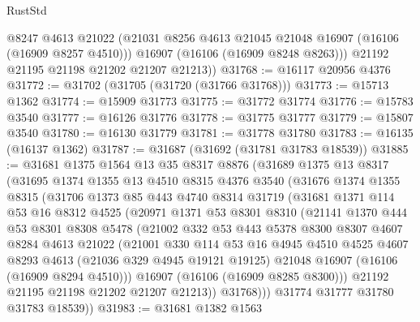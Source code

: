 \begin{lexlean}{RustStd}
\begin{coremodule}
          @8247
          @4613
          @21022
          (@21031 @8256 @4613 @21045 @21048 @16907 (@16106 (@16909 @8257 @4510)))
          @16907
          (@16106 (@16909 @8248 @8263)))
        @21192
        @21195
        @21198
        @21202
        @21207
        @21213))
@31768 := @16117 @20956 @4376
@31772 := @31702 (@31705 (@31720 (@31766 @31768)))
@31773 := @15713 @1362
@31774 := @15909 @31773
@31775 := @31772 @31774
@31776 := @15783 @3540
@31777 := @16126 @31776
@31778 := @31775 @31777
@31779 := @15807 @3540
@31780 := @16130 @31779
@31781 := @31778 @31780
@31783 := @16135 (@16137 @1362)
@31787 := @31687 (@31692 (@31781 @31783 @18539))
@31885 := @31681
    @1375
    @1564
    @13
    @35
    @8317
    @8876
    (@31689
      @1375
      @13
      @8317
      (@31695
        @1374
        @1355
        @13
        @4510
        @8315
        @4376
        @3540
        (@31676
          @1374
          @1355
          @8315
          (@31706
            @1373
            @85
            @443
            @4740
            @8314
            @31719
            (@31681
              @1371
              @114
              @53
              @16
              @8312
              @4525
              (@20971
                @1371
                @53
                @8301
                @8310
                (@21141
                  @1370
                  @444
                  @53
                  @8301
                  @8308
                  @5478
                  (@21002
                    @332
                    @53
                    @443
                    @5378
                    @8300
                    @8307
                    @4607
                    @8284
                    @4613
                    @21022
                    (@21001
                      @330
                      @114
                      @53
                      @16
                      @4945
                      @4510
                      @4525
                      @4607
                      @8293
                      @4613
                      (@21036 @329 @4945 @19121 @19125)
                      @21048
                      @16907
                      (@16106 (@16909 @8294 @4510)))
                    @16907
                    (@16106 (@16909 @8285 @8300)))
                  @21192
                  @21195
                  @21198
                  @21202
                  @21207
                  @21213))
              @31768)))
        @31774
        @31777
        @31780
        @31783
        @18539))
@31983 := @31681
    @1382
    @1563

\end{coremodule}
\end{lexlean}
